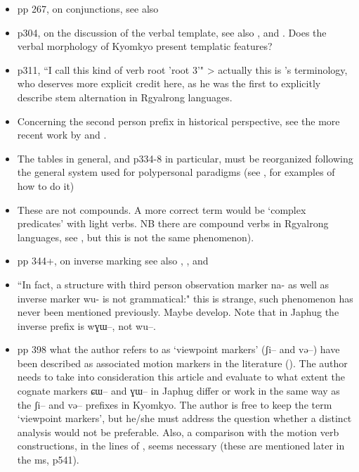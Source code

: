 \documentclass[oldfontcommands,oneside,a4paper,11pt]{article}
\newcommand{\ipa}[1]{{\phon \mbox{#1}}} %
\begin{document}
\begin{itemize}
\item pp 267, on conjunctions, see also \citet{jacques14linking}
\item p304, on the discussion of the verbal template, see also \citet[197-199]{jacques13harmonization}, \citet[12]{jacques14antipassive} and \citet{lai13affixale}. Does the verbal morphology of Kyomkyo present templatic features?
\item p311, ``I call this kind of verb root 'root 3'" > actually this is \citet{jackson00sidaba, jackson07irrealis}'s terminology, who deserves more explicit credit here, as he was the first to explicitly describe stem alternation in Rgyalrong languages.
\item Concerning the second person prefix in historical perspective, see the more recent work by \citet{jacques12agreement} and \citet{delancey14second}.
\item The tables in general, and p334-8 in particular, must be reorganized following the general system used for polypersonal paradigms (see \citet{gongxun14agreement}, \citet{jacques14inverse} for examples of how to do it)
\item These are not compounds. A more correct term would be `complex predicates' with light verbs. NB there are compound verbs in Rgyalrong languages, see \citet{jacques12incorp}, but this is not the same phenomenon).
\item pp 344+, on inverse marking see also \citet{gongxun14agreement}, \citet{jacques14inverse}, \citet{jacques14rtau} and \citet{lai14person}
\item ``In fact, a structure with third person observation marker na- as well as inverse marker wu- is not
grammatical:" this is strange, such phenomenon has never been mentioned previously. Maybe develop. Note that in Japhug the inverse prefix is \ipa{wɣɯ--}, not \ipa{wu--}.
\item pp 398 what the author refers to as `viewpoint markers' (\ipa{ʃi--} and \ipa{və--}) have been described as associated motion markers in the literature (\citealt{jacques13harmonization}). The author needs to take into consideration this article and evaluate to what extent the cognate markers \ipa{ɕɯ--} and \ipa{ɣɯ--} in Japhug differ or work in the same way as the \ipa{ʃi--} and \ipa{və--} prefixes in Kyomkyo. The author is free to keep the term `viewpoint markers', but he/she must address  the question whether a distinct analysis would not be preferable. Also, a comparison with the motion verb constructions, in the lines of \citet[203]{jacques13harmonization}, seems necessary (these are mentioned later in the ms, p541).

\end{itemize}
\end{document}
